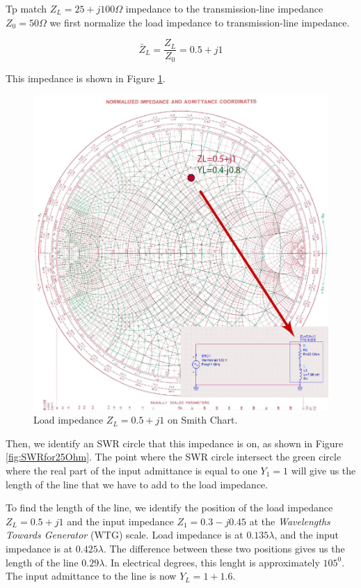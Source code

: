 \documentclass{ximera}
\begin{document}
Tp match $Z_L=25+j 100 \Omega$ impedance to the transmission-line impedance $Z_0=50 \Omega$ we first normalize the load impedance to transmission-line impedance.


\begin{equation}
\bar{Z}_L=\frac{Z_L}{Z_0}=0.5+j1
\end{equation}

This impedance is shown in Figure \ref{fig:PointSC}. 

\begin{figure}[htbp]
\begin{center}
\includegraphics[scale=0.4]{../jpg/Match1.jpg}
\end{center}
\caption{Load impedance $Z_L=0.5+j1$ on Smith Chart.}
\label{fig:PointSC}
\end{figure}

Then, we identify an SWR circle that this impedance is on, as shown in Figure \ref{fig:SWRfor25Ohm}. The point where the SWR circle intersect the green circle where the real part of the input admittance is equal to one $Y_1=1$ will give us the length of the line that we have to add to the load impedance. 

To find the length of the line, we identify the position of the load impedance $Z_L=0.5+j1$ and the input impedance $Z_1=0.3-j0.45$ at the {\it Wavelengths Towards Generator} (WTG) scale. Load impedance is at $0.135 \lambda$, and the input impedance is at $0.425 \lambda$. The difference between these two positions gives us the length of the line $0.29 \lambda$. In electrical degrees, this lenght is approximately $105^0$. The input admittance to the line is now $Y_L=1+1.6$.
\end{document}
